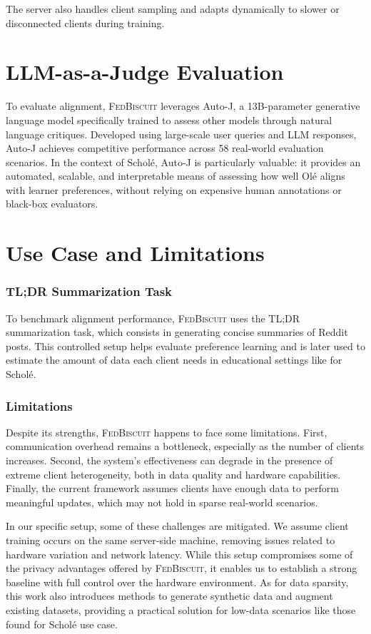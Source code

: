 The server also handles client sampling and adapts dynamically to slower or disconnected clients during training.

\section{LLM-as-a-Judge Evaluation} 
To evaluate alignment, \textsc{FedBiscuit} leverages Auto-J, a 13B-parameter generative language model specifically trained to assess other models through natural language critiques. Developed using large-scale user queries and LLM responses, Auto-J achieves competitive performance across 58 real-world evaluation scenarios. In the context of Schol\'e, Auto-J is particularly valuable: it provides an automated, scalable, and interpretable means of assessing how well Ol\'e aligns with learner preferences, without relying on expensive human annotations or black-box evaluators.

\section{Use Case and Limitations} 
\subsubsection{TL;DR Summarization Task} To benchmark alignment performance, \textsc{FedBiscuit} uses the TL;DR summarization task, which consists in generating concise summaries of Reddit posts. This controlled setup helps evaluate preference learning and is later used to estimate the amount of data each client needs in educational settings like for Schol\'e.

\subsubsection{Limitations} 
Despite its strengths, \textsc{FedBiscuit} happens to face some limitations. First, communication overhead remains a bottleneck, especially as the number of clients increases. Second, the system's effectiveness can degrade in the presence of extreme client heterogeneity, both in data quality and hardware capabilities. Finally, the current framework assumes clients have enough data to perform meaningful updates, which may not hold in sparse real-world scenarios. 

In our specific setup, some of these challenges are mitigated. We assume client training occurs on the same server-side machine, removing issues related to hardware variation and network latency. While this setup compromises some of the privacy advantages offered by \textsc{FedBiscuit}, it enables us to establish a strong baseline with full control over the hardware environment. As for data sparsity, this work also introduces methods to generate synthetic data and augment existing datasets, providing a practical solution for low-data scenarios like those found for Schol\'e use case.

